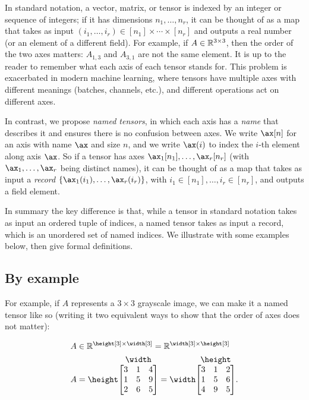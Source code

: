 In standard notation, a vector, matrix, or tensor is indexed by an integer or sequence of integers; if it has dimensions $n_1,\ldots,n_r$, it can be thought of as a map that takes as input $(i_1,\ldots,i_r) \in [n_1]\times \cdots \times [n_r]$ and outputs a real number (or an element of a different field).
For example, if $A \in \mathbb{R}^{3\times3}$, then the order of the two axes matters: $A_{1,3}$ and $A_{3,1}$ are not the same element. It is up to the reader to remember what each axis of each tensor stands for. This problem is exacerbated in modern machine learning, where tensors have multiple axes with different meanings (batches, channels, etc.), and different operations act on different axes. 

In contrast, we propose \emph{named tensors}, in which each axis has a \emph{name} that describes it and ensures there is no confusion between axes.
We write $\ax[n]$ for an axis with name $\ax$ and size $n$, and we write $\ax(i)$ to index the $i$-th element along axis $\ax$.
So if a tensor has axes $\ax_1[n_1],\ldots,\ax_r[n_r]$ (with $\ax_1,\ldots, \ax_r$ being distinct names), it can be thought of as a map that takes as input a \emph{record} $\{ \ax_1(i_1) ,\ldots, \ax_r(i_r) \}$, with $i_1 \in [n_1], \ldots, i_r \in [n_r]$, and outputs a field element.

In summary the key difference is that, while a tensor in standard notation takes as input an ordered tuple of indices, a named tensor takes as input a record, which is an unordered set of named indices. We illustrate with some examples below, then give formal definitions.

\subsection{By example}
\label{sec:example}

For example, if $A$ represents a $3\times 3$ grayscale image, we can make it a named tensor like so (writing it two equivalent ways to show that the order of axes does not matter):

\begin{align}
  A &\in \reals^{\height[3] \times \width[3]} = \reals^{\width[3] \times \height[3]} \notag \\
  A &= \nmatrix{\height}{\width}{
    3 & 1 & 4 \\
    1 & 5 & 9 \\
    2 & 6 & 5
  } = \nmatrix{\width}{\height}{
    3 & 1 & 2 \\
    1 & 5 & 6 \\
    4 & 9 & 5
  }. \label{eq:example_tensor}
\end{align}

